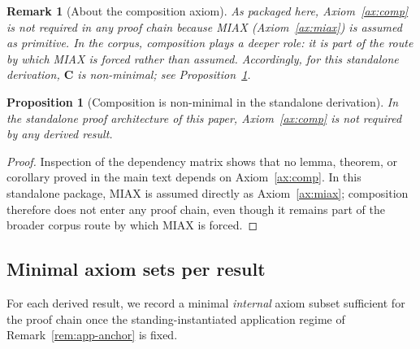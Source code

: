 \documentclass[12pt]{article}
\newtheorem{proposition}{Proposition}
\newtheorem{remark}{Remark}
\begin{document}
\begin{remark}[About the composition axiom]
As packaged here, Axiom~\ref{ax:comp} is not required in any proof chain because MIAX (Axiom~\ref{ax:miax}) is assumed as primitive.
In the corpus, composition plays a deeper role: it is part of the route by which MIAX is forced rather than assumed.
Accordingly, \emph{for this standalone derivation}, $\mathbf{C}$ is non-minimal; see Proposition~\ref{prop:comp-nonminimal}.
\end{remark}

\begin{proposition}[Composition is non-minimal in the standalone derivation]
\label{prop:comp-nonminimal}
In the standalone proof architecture of this paper, Axiom~\ref{ax:comp} is not required by any derived result.
\end{proposition}

\begin{proof}
Inspection of the dependency matrix shows that no lemma, theorem, or corollary proved in the main text depends on Axiom~\ref{ax:comp}. In this standalone package, MIAX is assumed directly as Axiom~\ref{ax:miax}; composition therefore does not enter any proof chain, even though it remains part of the broader corpus route by which MIAX is forced.
\end{proof}

\subsection{Minimal axiom sets per result}
\label{app:minsets}

For each derived result, we record a minimal \emph{internal} axiom subset sufficient for the proof chain once the standing-instantiated application regime of Remark~\ref{rem:app-anchor} is fixed.
\end{document}
